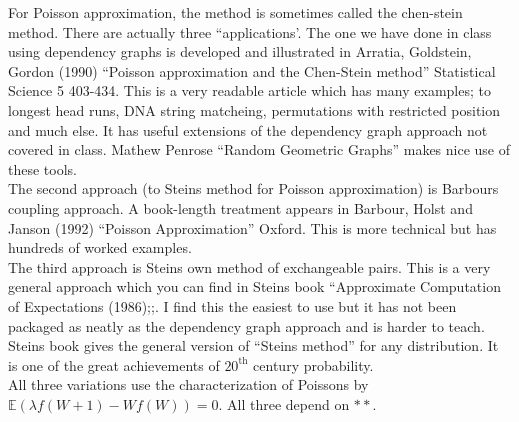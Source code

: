 \documentclass[12pt]{article}
\begin{document}
For Poisson approximation, the method is sometimes called the chen-stein method. There are actually three ``applications'. The one we have done in class using dependency graphs is developed and illustrated in Arratia, Goldstein, Gordon (1990) ``Poisson approximation and the Chen-Stein method'' Statistical Science 5 403-434. This is a very readable article which has many examples; to longest head runs, DNA string matcheing, permutations with restricted position and much else. It has useful extensions of the dependency graph approach not covered in class. Mathew Penrose ``Random Geometric Graphs'' makes nice use of these tools.\\
The second approach (to Steins method for Poisson approximation) is Barbours coupling approach. A book-length treatment appears in Barbour, Holst and Janson (1992) ``Poisson Approximation'' Oxford. This is more technical but has hundreds of worked examples.\\
The third approach is Steins own method of exchangeable pairs. This is a very general approach which you can find in Steins book ``Approximate Computation of Expectations (1986);;. I find this the easiest to use but it has not been packaged as neatly as the dependency graph approach and is harder to teach. Steins book gives the general version of ``Steins method'' for any distribution. It is one of the great achievements of $20^{\text{th}}$ century probability.\\
All three variations use the characterization of Poissons by $\mathbb{E}(\lambda f(W + 1) - Wf(W)) = 0$. All three depend on $\ast\ast$.\\
\end{document}
